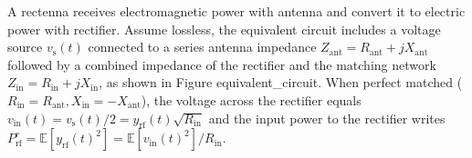 A rectenna receives electromagnetic power with antenna and convert it to electric power with rectifier. Assume lossless, the equivalent circuit includes a voltage source ${v_{\text{s}}}(t)$ connected to a series antenna impedance ${Z_{{\text{ant}}}} = {R_{{\text{ant}}}} + j{X_{{\text{ant}}}}$ followed by a combined impedance of the rectifier and the matching network ${Z_{{\text{in}}}} = {R_{{\text{in}}}} + j{X_{{\text{in}}}}$, as shown in Figure {equivalent_circuit}. When perfect matched (${R_{{\text{in}}}} = {R_{{\text{ant}}}},{X_{{\text{in}}}} =  - {X_{{\text{ant}}}}$), the voltage across the rectifier equals ${v_{{\text{in}}}}(t) = {v_{\text{s}}}(t)/2 = {y_{{\text{rf}}}}(t)\sqrt {{R_{{\text{in}}}}} $ and the input power to the rectifier writes $P_{{\text{rf}}}^r = \mathbb{E}\left[ {{y_{{\text{rf}}}}{{(t)}^2}} \right] = \mathbb{E}\left[ {{v_{{\text{in}}}}{{(t)}^2}} \right]/{R_{{\text{in}}}}$.

